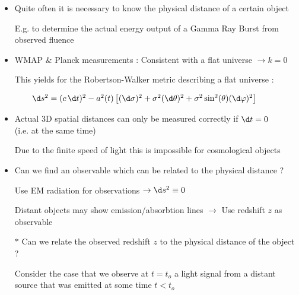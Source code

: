 \onecolumn
\begin{itemize}
\item Quite often it is necessary to know the physical distance of a certain object
\item[] E.g. to determine the actual energy output of a Gamma Ray Burst from observed fluence
\item WMAP \& Planck measurements : Consistent with a flat universe $\rightarrow k=0$
\item[] This yields for the Robertson-Walker metric describing a flat universe :
\item[] {\blue $\qquad \d s^{2}=(c\,\d t)^{2}-a^{2}(t)\left[
        (\d\sigma)^{2}+\sigma^{2}(\d\theta)^{2}+\sigma^{2}\sin^{2}(\theta)(\d\varphi)^{2}
        \right]$}
\item {\red Actual 3D spatial distances can only be measured correctly if $\d t=0$\\
      (i.e. at the same time)}
\item[] Due to the finite speed of light this is impossible for cosmological objects
\item {\blue Can we find an observable which can be related to the physical distance ?}
\item[] Use EM radiation for observations $\rightarrow \d s^{2} \equiv 0$
\item[] Distant objects may show emission/absorbtion lines $\rightarrow$ {\blue Use redshift $z$ as observable}
\item[$\ast$] {\red Can we relate the observed redshift $z$ to the physical distance of the object ?}
\item[] Consider the case that we observe at $t=t_{o}$ a light signal from a distant source that was emitted
        at some time $t<t_{o}$ 
\end{itemize}

